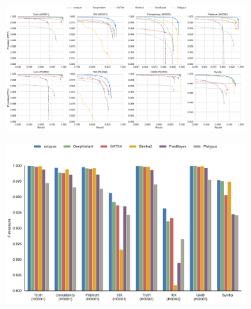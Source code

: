 \documentclass[notitlepage, twocolumn]{article}
\begin{document}
\begin{figure}[ht!]
    \centering
    \vspace{-0.5cm}
\captionsetup[subfigure]{position=top,labelfont=bf,textfont=normalfont,singlelinecheck=off,justification=raggedright}
    \begin{subfigure}[b]{\textwidth}
        \caption{}
        \includegraphics[width=\textwidth]{figures/germline_precision_recals}
        \label{fig:germline:precision-recall}
    \end{subfigure}
    \begin{subfigure}[b]{0.49\textwidth}
        \vspace{-0.5cm}
        \caption{}
        \includegraphics[width=\textwidth]{figures/F-Measures}
        \label{fig:germline:f-measure}
    \end{subfigure}
    \begin{subfigure}[b]{0.49\textwidth}
        \vspace{-0.5cm}
        \caption{}

\end{subfigure}
\end{figure}
\end{document}
